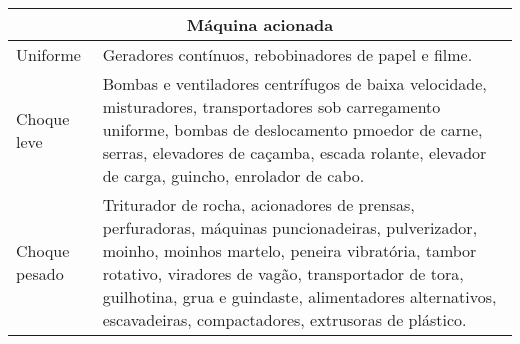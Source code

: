 \begin{table}[]
\begin{tabular}{|l|l|}
\hline
\multicolumn{2}{|c|}{\textbf{Máquina acionada}}                                                                                                                                                                                                                                                                                             \\ \hline
Uniforme        & Geradores contínuos, rebobinadores de papel e filme.                                                                                                                                                                                                                                                                      \\ \hline
Choque leve     & Bombas e ventiladores centrífugos de baixa velocidade, misturadores, transportadores sob carregamento uniforme, bombas de deslocamento pmoedor de carne, serras, elevadores de caçamba, escada rolante, elevador de carga, guincho, enrolador de cabo.                                                                             \\ \hline
Choque pesado   & Triturador de rocha, acionadores de prensas, perfuradoras, máquinas puncionadeiras, pulverizador, moinho, moinhos martelo, peneira vibratória, tambor rotativo, viradores de vagão, transportador de tora, guilhotina, grua e guindaste, alimentadores alternativos, escavadeiras, compactadores, extrusoras de plástico. \\ \hline
\end{tabular}
\end{table}